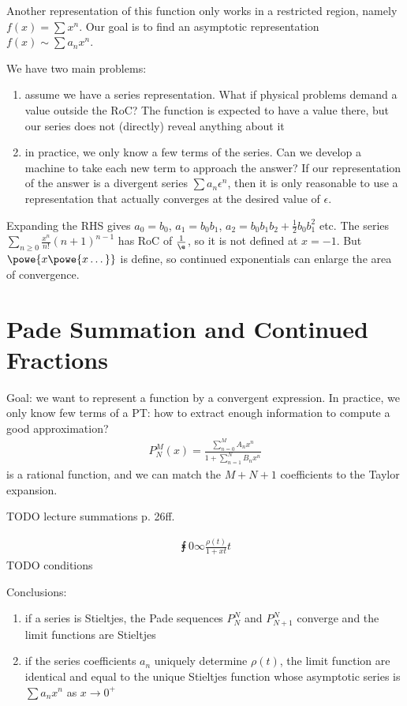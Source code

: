 \documentclass[english, parskip=full]{scrbook}
\newcommand{\definition}[2]{\begin{tcolorbox}[colback=colorbackgrounddefinition,colframe=colordefinition, breakable,enhanced,title=\textbf{#1}.]#2\end{tcolorbox}}
\newcommand{\note}[1]{\begin{tcolorbox}[colback=colorbackgroundnote,colframe=colornote, breakable,enhanced]#1\end{tcolorbox}}
\newcommand{\example}[3]{\begin{tcolorbox}[colback=colorbackgroundexample,colframe=colorexample, breakable,enhanced,title={\textbf{#1}: #2.}]#3\end{tcolorbox}}
\begin{document}
\example{Computing a function}{$\frac{1}{1-x}$}{
Another representation of this function only works in a restricted region, namely $f(x)=\sum x^n$.
Our goal is to find an asymptotic representation $f(x)\sim \sum a_n x^n$.

We have two main problems:
\begin{enumerate}
\item assume we have a series representation. What if physical problems demand a value outside the RoC? The function is expected to have a value there, but our series does not (directly) reveal anything about it
\item in practice, we only know a few terms of the series. Can we develop a machine to take each new term to approach the answer?
If our representation of the answer is a divergent series $\sum a_n \epsilon^n$, then it is only reasonable to use a representation that actually converges at the desired value of $\epsilon$.
\end{enumerate}
}
\example{Continued Exponential}{$\sum a_n x^n = b_0\powe{b_1x^{b_2x\dots}}$}{
Expanding the RHS gives $a_0=b_0$, $a_1=b_0b_1$, $a_2=b_0b_1b_2 + \frac{1}{2} b_0 b_1^2$ etc.
The series $\sum_{n\ge 0} \frac{x^n}{n!} (n+1)^{n-1}$ has RoC of $\frac{1}{\e}$, so it is not defined at $x=-1$.
But $\powe{x \powe{x \dots}}$ is define, so continued exponentials can enlarge the area of convergence.
}
\section{Pade Summation and Continued Fractions}
\definition{Pade Summation}{
Goal: we want to represent a function by a convergent expression.
In practice, we only know few terms of a PT: how to extract enough information to compute a good approximation?
\begin{align}
P^M_N(x) = \frac{\sum_{n=0}^M A_n x^n}{1 + \sum_{n=1}^N B_n x^n}
\end{align}
is a rational function, and we can match the $M+N+1$ coefficients to the Taylor expansion.
}
TODO lecture summations p. 26ff.
\definition{Stieltjes Function}{
\begin{align}
\intx{0}{\infty}{\frac{\rho(t)}{1+xt}}{t}
\end{align}
TODO conditions
}
\note{Conclusions:
\begin{enumerate}
\item if a series is Stieltjes, the Pade sequences $P^N_N$ and $P_{N+1}^N$ converge and the limit functions are Stieltjes
\item if the series coefficients $a_n$ uniquely determine $\rho(t)$, the limit function are identical and equal to the unique Stieltjes function whose asymptotic series is $\sum a_n x^n$ as $x\rightarrow 0^+$
\end{enumerate}
}
\end{document}
